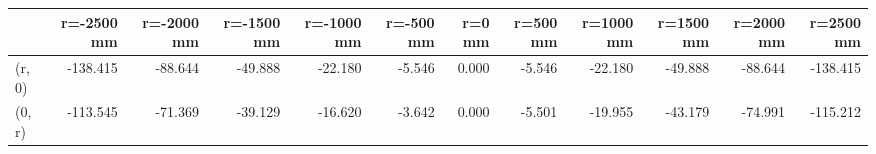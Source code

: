 \documentclass[convert={convertexe={magick.exe}}]{standalone}
\begin{document}
\begin{tabular}{lrrrrrrrrrrr}
\toprule
{} &  r=-2500 mm &  r=-2000 mm &  r=-1500 mm &  r=-1000 mm &  r=-500 mm &  r=0 mm &  r=500 mm &  r=1000 mm &  r=1500 mm &  r=2000 mm &  r=2500 mm \\
\midrule
(r, 0) &    -138.415 &     -88.644 &     -49.888 &     -22.180 &     -5.546 &   0.000 &    -5.546 &    -22.180 &    -49.888 &    -88.644 &   -138.415 \\
(0, r) &    -113.545 &     -71.369 &     -39.129 &     -16.620 &     -3.642 &   0.000 &    -5.501 &    -19.955 &    -43.179 &    -74.991 &   -115.212 \\
\bottomrule
\end{tabular}
\end{document}
